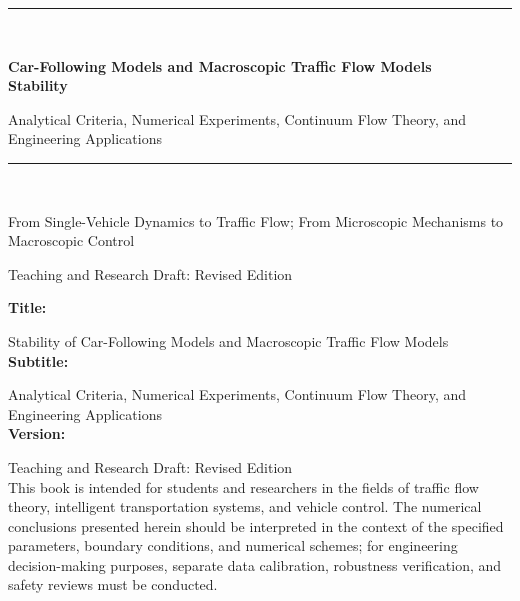 \documentclass[11pt,a4paper,openany]{book}
\numberwithin{equation}{chapter}
\numberwithin{figure}{chapter}
\numberwithin{table}{chapter}
\begin{document}
\frontmatter
\begin{titlepage}
  \thispagestyle{empty}
  \centering
  \vspace*{0.13\textheight}
  {\color{navy}\rule{0.72\textwidth}{1.2pt}}
\\[1.8em]
  {\sffamily\bfseries\fontsize{30}{40}\selectfont Car-Following Models and Macroscopic Traffic Flow Models\\[0.28em] Stability

\par}
  \vspace{1.1em}
  {\sffamily\Large

Analytical Criteria, Numerical Experiments, Continuum Flow Theory, and Engineering Applications

\par}
  \vspace{1.8em}
  {\color{navy}\rule{0.72\textwidth}{0.7pt}}\\[3.5em]
  {\quotefont\large

From Single-Vehicle Dynamics to Traffic Flow; From Microscopic Mechanisms to Macroscopic Control

\par}
  \vfill
  {\sffamily\large

Teaching and Research Draft: Revised Edition

\par}
  \vspace{0.7em}
  {\par}
\end{titlepage}

\thispagestyle{empty}
\vspace*{\fill}
{\small
\noindent\textbf{Title:}

Stability of Car-Following Models and Macroscopic Traffic Flow Models
\\
\textbf{Subtitle:}

Analytical Criteria, Numerical Experiments, Continuum Flow Theory, and Engineering Applications
\\
\textbf{Version:}

Teaching and Research Draft: Revised Edition
\\[0.8em]
This book is intended for students and researchers in the fields of traffic flow theory, intelligent transportation systems, and vehicle control. The numerical conclusions presented herein should be interpreted in the context of the specified parameters, boundary conditions, and numerical schemes; for engineering decision-making purposes, separate data calibration, robustness verification, and safety reviews must be conducted.
}
\clearpage
\end{document}
